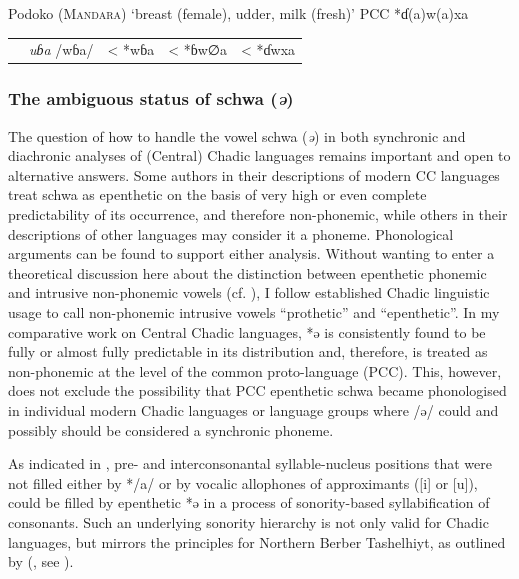 \documentclass[output=paper]{langscibook}
\begin{document}
\ea%
    \label{ex:wolff:5}
         Podoko (\textsc{Mandara)} ‘breast (female), udder, milk (fresh)’   PCC *ɗ(a)w(a)xa
\begin{tabular}{lllll}
 & \textit{uɓa}  /wɓa/ & < *wɓa & < *ɓw∅a & < *ɗwxa\\
\end{tabular}\noindent

\z

\subsubsection{The ambiguous status of schwa (\textit{ə})}
\label{sec:Wolff:1.4.3}
The question of how to handle the vowel schwa (\textit{ə}) in both synchronic and diachronic analyses of (Central) Chadic languages remains important and open to alternative answers. Some authors in their descriptions of modern CC languages treat schwa as epenthetic on the basis of very high or even complete predictability of its occurrence, and therefore non-phonemic, while others in their descriptions of other languages may consider it a phoneme. Phonological arguments can be found to support either analysis. Without wanting to enter a theoretical discussion here about the distinction between epenthetic phonemic and intrusive non-phonemic vowels (cf. \citealt{Hall2006}), I follow established Chadic linguistic usage to call non-phonemic intrusive vowels ``prothetic'' and ``epenthetic''. In my comparative work on Central Chadic languages, *ə is consistently found to be fully or almost fully predictable in its distribution and, therefore, is treated as non-phonemic at the level of the common proto-language (PCC). This, however, does not exclude the possibility that PCC epenthetic schwa became phonologised in individual modern Chadic languages or language groups where /ə/ could and possibly should be considered a synchronic phoneme.

As indicated in , pre- and interconsonantal syllable-nucleus positions that were not filled either by */a/ or by vocalic allophones of approximants ([i] or [u]), could be filled by epenthetic *ə in a process of sonority-based syllabification of consonants. Such an underlying sonority hierarchy is not only valid for Chadic languages, but mirrors the principles for Northern Berber Tashelhiyt, as outlined by \citeauthor{Kossmann2012} (\citeyear[28ff.;]{Kossmann2012}, see ).
\end{document}

